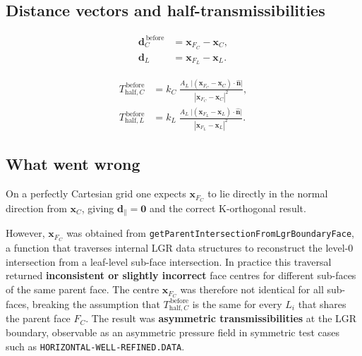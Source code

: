 \documentclass[11pt,a4paper]{article}
\begin{document}
\subsection*{Distance vectors and half-transmissibilities}

\begin{align}
  \mathbf{d}_C^{\,\text{before}} &=
    \mathbf{x}_{F_C} - \mathbf{x}_C,
  \label{eq:dC_before}\\[6pt]
  \mathbf{d}_L &=
    \mathbf{x}_{F_L} - \mathbf{x}_L.
  \label{eq:dL}
\end{align}

\begin{align}
  T_{\mathrm{half},C}^{\,\text{before}}
    &= k_C\;\frac{A_L\;\bigl|(\mathbf{x}_{F_C}-\mathbf{x}_C)
                               \cdot\hat{\mathbf{n}}\bigr|}
                 {|\mathbf{x}_{F_C}-\mathbf{x}_C|^{2}},
  \label{eq:TC_before}\\[10pt]
  T_{\mathrm{half},L}^{\,\text{before}}
    &= k_L\;\frac{A_L\;\bigl|(\mathbf{x}_{F_L}-\mathbf{x}_L)
                               \cdot\hat{\mathbf{n}}\bigr|}
                 {|\mathbf{x}_{F_L}-\mathbf{x}_L|^{2}}.
  \label{eq:TL_before}
\end{align}

\subsection*{What went wrong}

On a perfectly Cartesian grid one expects
$\mathbf{x}_{F_C}$ to lie directly in the normal direction from
$\mathbf{x}_C$, giving $\mathbf{d}_\parallel = \mathbf{0}$ and the
correct K-orthogonal result.

However, $\mathbf{x}_{F_C}$ was obtained from
\texttt{getParentIntersectionFromLgrBoundaryFace}, a function that
traverses internal LGR data structures to reconstruct the level-0
intersection from a leaf-level sub-face intersection.
In practice this traversal returned \textbf{inconsistent or slightly
incorrect} face centres for different sub-faces of the same parent face.
The centre $\mathbf{x}_{F_C}$ was therefore not identical for all
sub-faces, breaking the assumption that
$T_{\mathrm{half},C}^{\,\text{before}}$ is the same for every $L_i$
that shares the parent face $F_C$.
The result was \textbf{asymmetric transmissibilities} at the LGR
boundary, observable as an asymmetric pressure field in symmetric test
cases such as \texttt{HORIZONTAL-WELL-REFINED.DATA}.

\end{document}
